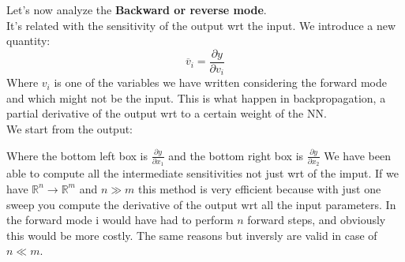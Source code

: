 Let's now analyze the \textbf{Backward or reverse mode}.\\
It's related with the sensitivity of the output wrt the input. We introduce a new quantity:
\[
    \overline{v}_i = \dfrac{\partial y}{\partial v_i}   
\]
Where $v_i$ is one of the variables we have written considering the forward mode and which might not be the input. This is what happen in backpropagation, a partial derivative of the output wrt to a certain weight of the NN.\\
We start from the output:
\begin{center}
\end{center}
Where the bottom left box is $\frac{\partial y}{\partial x_{1}}$ and the bottom right box is $\frac{\partial y}{\partial x_{2}}$
We have been able to compute all the intermediate sensitivities not just wrt of the imput. If we have $\mathbb{R}^n \to \mathbb{R}^m$ and $n \gg m$ this method is very efficient because with just one sweep you compute the derivative of the output wrt all the input parameters. In the forward mode i would have had to perform $n$ forward steps, and obviously this would be more costly.
The same reasons but inversly are valid in case of $n \ll m$.\\

